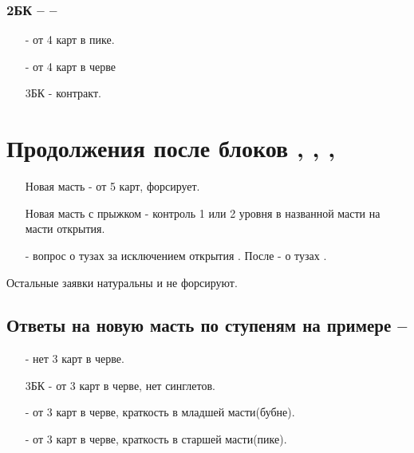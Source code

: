 \documentclass{article}
\begin{document}
\subsubsection{2БК --  -- }
\begin{enumerate}
    \item[\he{3}] - от 4 карт в пике.
    \item[\sp{3}] - от 4 карт в черве
    \item[3БК] - контракт.
\end{enumerate}
\section{Продолжения после блоков , , , }
\begin{enumerate}
    \item[Новая масть] - от 5 карт, форсирует. 
    \item[Новая масть с прыжком] - контроль 1 или 2 уровня в названной масти на масти открытия.
    \item[\cl{4}] - вопрос о тузах за исключением открытия . После  - о тузах .
\end{enumerate}
Остальные заявки натуральны и не форсируют.
\subsection{Ответы на новую масть по ступеням на примере  -- }
\begin{enumerate}
    \item[\sp{3}] - нет 3 карт в черве.
    \item[3БК] -  от 3 карт в черве, нет синглетов.
    \item[\cl{4}] -  от 3 карт в черве, краткость в младшей масти(бубне).
    \item[\di{4}] - от 3 карт в черве, краткость в старшей масти(пике).
\end{enumerate}
\end{document}
